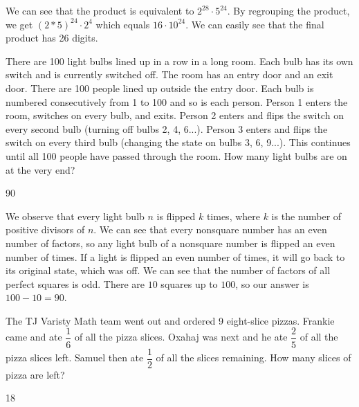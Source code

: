 \documentclass[11pt]{article}
\begin{document}
\begin{solution}
We can see that the product is equivalent to $2^{28} \cdot 5^{24}$. By regrouping the product, we get $(2*5)^{24} \cdot 2^{4}$ which equals $16 \cdot 10^{24}$. We can easily see that the final product has 26 digits. 
\end{solution}


\begin{problem}
There are 100 light bulbs lined up in a row in a long room. Each bulb has its own switch and is currently switched off. The room has an entry door and an exit door. There are 100 people lined up outside the entry door. Each bulb is numbered consecutively from 1 to 100 and so is each person. Person 1 enters the room, switches on every bulb, and exits. Person 2 enters and flips the switch on every second bulb (turning off bulbs 2, 4, 6...). Person 3 enters and flips the switch on every third bulb (changing the state on bulbs 3, 6, 9...). This continues until all 100 people have passed through the room. How many light bulbs are on at the very end?
\end{problem}

\begin{answer}
90
\end{answer}

\begin{solution} %
We observe that every light bulb $n$ is flipped $k$ times, where $k$ is the number of positive divisors of $n$. We can see that every nonsquare number has an even number of factors, so any light bulb of a nonsquare number is flipped an even number of times. If a light is flipped an even number of times, it will go back to its original state, which was off. We can see that the number of factors of all perfect squares is odd. There are $10$ squares up to $100$, so our answer is $100 - 10 = 90$.
\end{solution}


\begin{problem} %
The TJ Varisty Math team went out and ordered 9 eight-slice pizzas. Frankie came and ate $\dfrac{1}{6}$ of all the pizza slices. Oxahaj was next and he ate $\dfrac{2}{5}$ of all the pizza slices left. Samuel then ate $\dfrac{1}{2}$ of all the slices remaining. How many slices of pizza are left?
\end{problem}

\begin{answer}
18
\end{answer}
\end{document}

